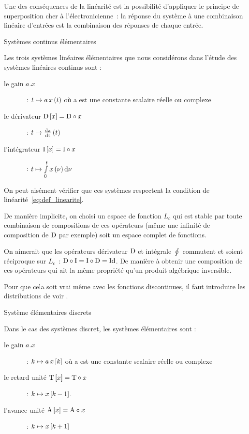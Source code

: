 Une des conséquences de la linéarité est la possibilité d'appliquer le
principe de superposition cher à l'électronicienne~: \og{} la réponse
du système à une combinaison linéaire d'entrées est la combinaison des
réponses de chaque entrée.\fg{}

\begin{definition}{Systèmes continus élémentaires}
  \label{def:systeme_elementaires_continus}
  
Les trois systèmes linéaires élémentaires que nous considérons dans
l'étude des systèmes linéaires continus sont :
\begin{description}
\item[le gain $a.x$]~: $t \mapsto a\,x\left(t\right)$ où a est une constante
  scalaire réelle ou complexe
\item[le dérivateur $\mathrm{D}\left[x\right]=\mathrm{D}\circ x$]~: $ t \mapsto \frac{\mathrm{d{x}}}{\mathrm{d{t}}}\left(t\right) $
\item[l'intégrateur $\mathrm{I}\left[x\right]=\mathrm{I}\circ x$]~: $ t \mapsto \int\limits_{0}^{t}{x\left(\nu\right)\mathrm{d{\nu}}}$ 
\end{description}
\end{definition}

On peut aisément vérifier que ces systèmes respectent la condition de
linéarité~\ref{eq:def_linearite}.

\begin{remarque}
  De manière implicite, on choisi un espace de fonction $L_c$ qui est
  stable par toute combinaison de compositions de ces opérateurs (même
  une infinité de composition de $\mathrm{D}$ par exemple) soit un espace
  complet de fonctions.

  On aimerait que les opérateurs dérivateur $\mathrm{D}$ et intégrale
  $\oint$ commutent et soient réciproque sur $L_c$~:
  $\mathrm{D}\circ\mathrm{I}=\mathrm{I}\circ\mathrm{D}=\mathrm{Id}$. De manière à obtenir une
  composition de ces opérateurs qui ait la même propriété qu'un
  produit algébrique inversible.
  
  Pour que cela soit vrai même avec les fonctions discontinues, il
  faut introduire les distributions de \Dirac{} voir
  .
\end{remarque}

\begin{definition}{Système élémentaires discrets}
  
Dans le cas des systèmes discret, les systèmes élémentaires sont :
\begin{description}
\item[le gain $a.x$]~: $ k \mapsto a\,x\left[k\right]$ où a est une constante
  scalaire réelle ou complexe
\item[le retard unité $\mathrm{T}\left[x\right]=\mathrm{T}\circ x$]~: $ k \mapsto x\left[k-1\right]$.
\item[l'avance unité $\mathrm{A}\left[x\right]=\mathrm{A}\circ x$]~: $ k \mapsto x\left[k+1\right] $ 
\end{description}
\end{definition}

